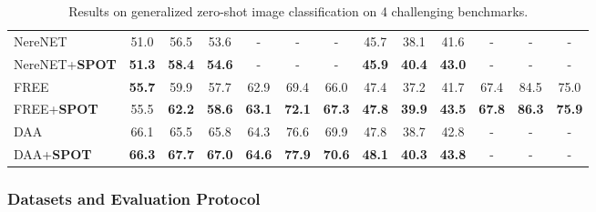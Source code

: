 \documentclass[10pt,twocolumn,letterpaper]{article}
\begin{document}
\begin{table*}[htb]
\begin{center}
\begin{tabular}{|l|c|c|c|c|c|c|c|c|c|c|c|c|}
\hline
NereNET                                      & 51.0                              & 56.5                              & 53.6                              & -                                 & -                                 & -                                 & 45.7                              & 38.1                              & 41.6                              & -                                 & -                                 & -                                 \\
NereNET+\textbf{SPOT}                                 & \textbf{51.3}                     & \textbf{58.4}                     & \textbf{54.6}                     & -                                 & -                                 & -                                 & \textbf{45.9}                     & \textbf{40.4}                     & \textbf{43.0}                     & -                                 & -                                 & -                                 \\
\hline
FREE                                         & \textbf{55.7} & 59.9    & 57.7         & 62.9         & 69.4         & 66.0      & 47.4        & 37.2          & 41.7          & 67.4       & 84.5         & 75.0     \\
FREE+\textbf{SPOT}                                    & 55.5         & \textbf{62.2} & \textbf{58.6} & \textbf{63.1} & \textbf{72.1} & \textbf{67.3} & \textbf{47.8} & \textbf{39.9} & \textbf{43.5} & \textbf{67.8} & \textbf{86.3} & \textbf{75.9} \\
\hline
DAA                                          & 66.1          & 65.5 & 65.8        & 64.3         & 76.6        & 69.9         & 47.8          & 38.7        & 42.8         & -                                 & -                                 & -                                 \\
DAA+\textbf{SPOT}                                     & \textbf{66.3} & \textbf{67.7} & \textbf{67.0} & \textbf{64.6} & \textbf{77.9} & \textbf{70.6} & \textbf{48.1} & \textbf{40.3} & \textbf{43.8} & -                                 & -                                 & -                               \\ 
\hline
\end{tabular}
\end{center}
\caption{Results on generalized zero-shot image classification on 4 challenging benchmarks.
}
\end{table*}

\subsubsection{Datasets and Evaluation Protocol}
\end{document}
